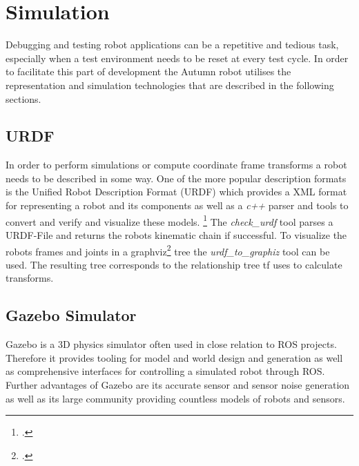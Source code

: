 \section{Simulation}
Debugging and testing robot applications can be a repetitive and tedious task, especially when a test environment needs to be reset at every test cycle. In order to facilitate this part of development the Autumn robot utilises the representation and simulation technologies that are described in the following sections.

\subsection{URDF}
In order to perform simulations or compute coordinate frame transforms a robot needs to be described in some way. One of the more popular description formats is the Unified Robot Description Format (URDF) which provides a XML format for representing a robot and its components as well as a \textit{c++} parser and tools to convert and verify and visualize these models. \footcite{openSourceRoboticsFoundationURDFNodate}
The \textit{check\_urdf} tool parses a URDF-File and returns the robots kinematic chain if successful.
To visualize the robots frames and joints in a graphviz\footcite{graphvizAuthorsAboutNodate} tree the \textit{urdf\_to\_graphiz} tool can be used. The resulting tree corresponds to the relationship tree tf uses to calculate transforms.

\subsection{Gazebo Simulator}
Gazebo is a 3D physics simulator often used in close relation to ROS projects. Therefore it provides tooling for model and world design and generation as well as comprehensive interfaces for controlling a simulated robot through ROS. Further advantages of Gazebo are its accurate sensor and sensor noise generation as well as its large community providing countless models of robots and sensors.

\filbreak
